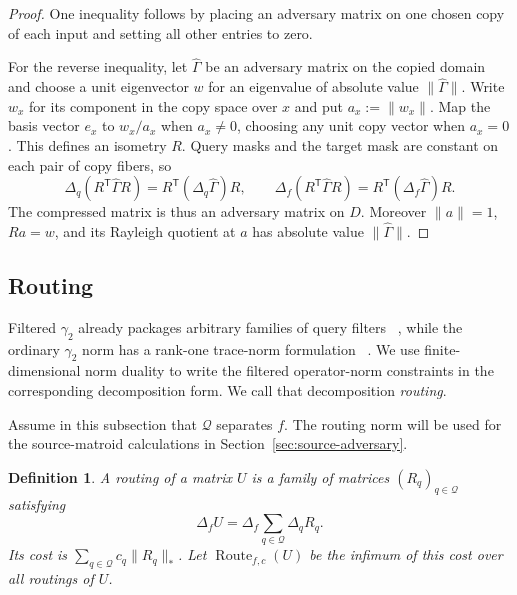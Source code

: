 \documentclass[11pt]{article}
\numberwithin{equation}{section}
\newtheorem{definition}{Definition}[section]
\theoremstyle{remark}
\begin{document}
\begin{proof}
One inequality follows by placing an adversary matrix on one chosen copy of
each input and setting all other entries to zero.

For the reverse inequality, let $\widehat\Gamma$ be an adversary matrix on
the copied domain and choose a unit eigenvector $w$ for an eigenvalue of
absolute value $\|\widehat\Gamma\|$.  Write $w_x$ for its component in the
copy space over $x$ and put $a_x:=\|w_x\|$.  Map the basis vector $e_x$ to
$w_x/a_x$ when $a_x\neq0$, choosing any unit copy vector when $a_x=0$.
This defines an isometry $R$.  Query masks and the target mask are constant
on each pair of copy fibers, so
\begin{equation}
    \Delta_q(R^{\mathsf T}\widehat\Gamma R)=R^{\mathsf T}(\Delta_q\widehat\Gamma)R,
    \qquad
    \Delta_f(R^{\mathsf T}\widehat\Gamma R)=R^{\mathsf T}(\Delta_f\widehat\Gamma)R.
\end{equation}
The compressed matrix is thus an adversary matrix on $D$.  Moreover
$\|a\|=1$, $Ra=w$, and its Rayleigh quotient at $a$ has absolute value
$\|\widehat\Gamma\|$.
\end{proof}


\subsection{Routing}
\label{subsec:adversary-routing}

Filtered $\gamma_2$ already packages arbitrary families of query filters
~\cite{LeeMittalReichardtSpalekSzegedy2011}, while the ordinary
$\gamma_2$ norm has a rank-one trace-norm formulation
~\cite{LeeShraibmanSpalek2008}. We use finite-dimensional norm duality to
write the filtered operator-norm constraints in the corresponding
decomposition form. We call that decomposition \emph{routing}.

Assume in this subsection that $\mathcal Q$ separates $f$. The routing norm
will be used for the source-matroid calculations in
Section~\ref{sec:source-adversary}.

\begin{definition}
\label{def:routing-norm}
\label{def:source-routing-norm}
A \emph{routing} of a matrix $U$ is a family of matrices
$(R_q)_{q\in\mathcal Q}$ satisfying
\begin{equation}
    \Delta_fU=\Delta_f\sum_{q\in\mathcal Q}\Delta_qR_q.
\end{equation}
Its cost is $\sum_{q\in\mathcal Q}c_q\|R_q\|_*$.  Let
$\operatorname{Route}_{f,c}(U)$ be the infimum of this cost over all routings of $U$.
\end{definition}
\end{document}
